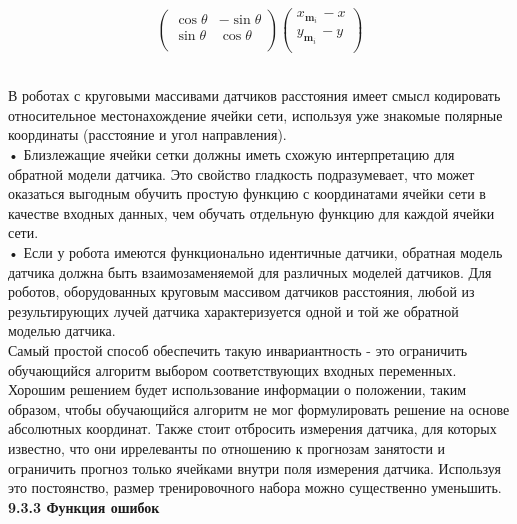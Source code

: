 \documentclass[10pt,a4paper]{article}
\begin{document}
\begin{minipage}{0.2\textwidth}
\begin{equation*}
\left(\begin{array}{cc}
\cos\theta&-\sin\theta\\
\sin\theta&\cos\theta\\
\end{array}\right)
\left(\begin{array}{c}
x_{\textbf{m}_i}\,-x\\
y_{\textbf{m}_i}\,-y\\
\end{array}\right)
\end{equation*}
\end{minipage}\\

В роботах с круговыми массивами датчиков расстояния имеет смысл кодировать относительное местонахождение ячейки сети, используя уже знакомые полярные координаты (расстояние и угол направления).\\

•	Близлежащие ячейки сетки должны иметь схожую интерпретацию для обратной модели датчика. Это свойство гладкость подразумевает, что может оказаться выгодным обучить простую функцию с координатами ячейки сети в качестве входных данных, чем обучать отдельную функцию для каждой ячейки сети.\\

•	Если у робота имеются функционально идентичные датчики, обратная модель датчика должна быть взаимозаменяемой для различных моделей датчиков. Для роботов, оборудованных круговым массивом датчиков расстояния, любой из результирующих лучей датчика характеризуется одной и той же обратной моделью датчика.\\

Самый простой способ обеспечить такую инвариантность - это ограничить обучающийся алгоритм выбором соответствующих входных переменных. Хорошим решением будет использование информации о положении, таким образом, чтобы обучающийся алгоритм не мог формулировать решение на основе абсолютных координат. Также стоит отбросить измерения датчика, для которых известно, что они иррелеванты по отношению к прогнозам занятости и ограничить прогноз только ячейками внутри поля измерения датчика. Используя это постоянство, размер тренировочного набора можно существенно уменьшить.\\

\textbf{9.3.3	Функция ошибок}\\
\end{document}
